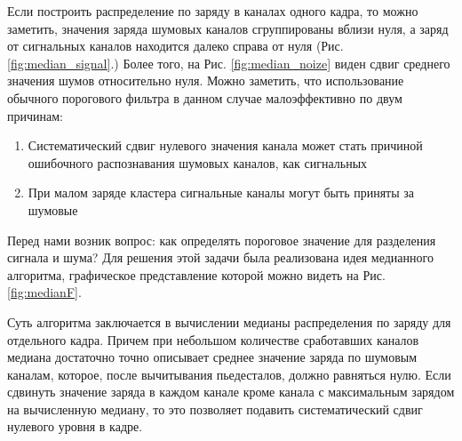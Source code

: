 Если построить распределение по заряду в каналах одного кадра, то можно заметить, значения заряда шумовых каналов  сгруппированы вблизи нуля, а заряд от сигнальных каналов находится далеко справа от нуля (Рис. \ref{fig:median_signal}.) Более того, на Рис. \ref{fig:median_noize} виден сдвиг среднего значения шумов относительно нуля. Можно заметить, что использование обычного порогового фильтра в данном случае малоэффективно по двум причинам:
\begin{enumerate}
	\item Систематический сдвиг нулевого значения канала может стать причиной ошибочного распознавания шумовых каналов, как сигнальных
	\item При малом заряде кластера сигнальные каналы могут быть приняты за шумовые
\end{enumerate}
 Перед нами возник вопрос: как определять пороговое значение для разделения сигнала и шума? Для решения этой задачи была реализована идея медианного алгоритма, графическое представление которой можно видеть на Рис.\ref{fig:medianF}. 
 \par Суть алгоритма заключается в вычислении медианы распределения по заряду для отдельного кадра. Причем при небольшом количестве сработавших каналов медиана достаточно точно описывает среднее значение заряда по шумовым каналам, которое, после вычитывания пьедесталов, должно равняться нулю. Если сдвинуть значение заряда в каждом канале кроме канала с максимальным зарядом на вычисленную медиану, то это позволяет подавить систематический сдвиг нулевого уровня в кадре. 
